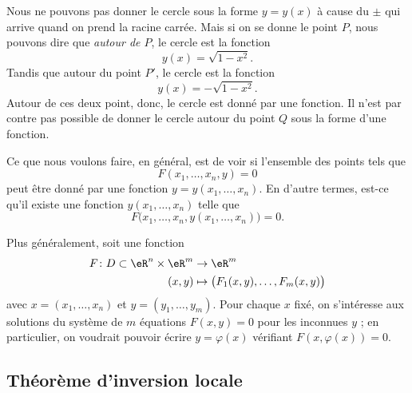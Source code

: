 %

Nous ne pouvons pas donner le cercle sous la forme $y=y(x)$ à cause du $\pm$ qui arrive quand on prend la racine carrée. Mais si on se donne le point $P$, nous pouvons dire que \emph{autour de $P$}, le cercle est la fonction
\begin{equation}
    y(x)=\sqrt{1-x^2}.
\end{equation}
Tandis que autour du point $P'$, le cercle est la fonction
\begin{equation}
    y(x)=-\sqrt{1-x^2}.
\end{equation}
Autour de ces deux point, donc, le cercle est donné par une fonction. Il n'est par contre pas possible de donner le cercle autour du point $Q$ sous la forme d'une fonction.

Ce que nous voulons faire, en général, est de voir si l'ensemble des points tels que
\begin{equation}
    F(x_1,\ldots,x_n,y)=0
\end{equation}
peut être donné par une fonction $y=y(x_1,\ldots,x_n)$. En d'autre termes, est-ce qu'il existe une fonction $y(x_1,\ldots,x_n)$ telle que
\begin{equation}
    F\big( x_1,\ldots,x_n,y(x_1,\ldots,x_n)\big)=0.
\end{equation}

Plus généralement, soit une fonction
\begin{equation}
    \begin{aligned}
        F\colon D\subset \eR^n\times \eR^m&\to \eR^m \\
        (x,y)&\mapsto \big( F_1(x,y),\ldots, F_m(x,y) \big) 
    \end{aligned}
\end{equation}
avec $x = (x_1,\ldots, x_n)$ et $y = (y_1,\ldots,y_m)$. Pour chaque $x$ fixé, on s'intéresse aux solutions du système de $m$ équations $F(x,y) = 0$ pour les inconnues $y$ ; en particulier, on voudrait pouvoir écrire $y = \varphi(x)$ vérifiant $F(x,\varphi(x)) = 0$.

\subsection{Théorème d'inversion locale}

